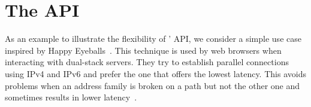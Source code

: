 


\section{The \tcpls API}
\label{appendix:api}

As an example to illustrate the flexibility of \tcpls' API, we consider a simple
use case inspired by Happy Eyeballs~\cite{rfc8305}. This technique is
used by web browsers when interacting with dual-stack servers. They
try to establish parallel \tcp connections using IPv4 and IPv6 and prefer the
one that offers the lowest latency. This avoids problems when an address
family is broken on a path but not the other one and sometimes results in
lower latency~\cite{bajpai2019longitudinal}.

